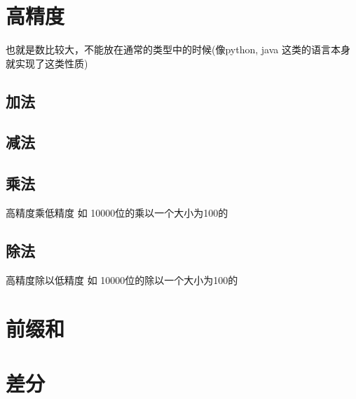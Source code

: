 \section{高精度}
也就是数比较大，不能放在通常的类型中的时候(像python, java 这类的语言本身就实现了这类性质)
\subsection{加法}

\subsection{减法}

\subsection{乘法}
高精度乘低精度 如 10000位的乘以一个大小为100的

\subsection{除法}
高精度除以低精度 如 10000位的除以一个大小为100的


\section{前缀和}


\section{差分}



